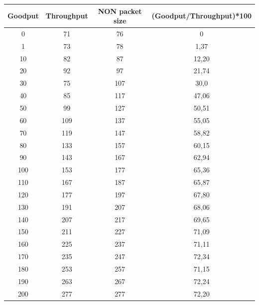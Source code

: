 \begin{center}
 \begin{tabular}{||c c c c||} 
 \hline
 Goodput & Throughput & NON packet size & (Goodput/Throughput)*100 \\ [0.5ex] 
 \hline\hline
 0 & 71 & 76 & 0 \\ 
 \hline
 1 & 73 & 78 & 1,37 \\
 \hline
 10 & 82 & 87 & 12,20 \\
 \hline
 20 & 92 & 97 & 21,74 \\
  \hline
 30 & 75 & 107 & 30,0 \\
  \hline
 40 & 85 & 117 & 47,06 \\
  \hline
 50 & 99 & 127 & 50,51 \\
  \hline
 60 & 109 & 137 & 55,05 \\
  \hline
 70 & 119 & 147 & 58,82 \\
  \hline
 80 & 133 & 157 & 60,15 \\
  \hline
 90 & 143 & 167 & 62,94 \\
 \hline
 100 & 153 & 177 & 65,36 \\
 \hline
 110 & 167 & 187 & 65,87 \\
 \hline
 120 & 177 & 197 & 67,80 \\
 \hline
 130 & 191 & 207 & 68,06 \\
 \hline
 140 & 207 & 217 & 69,65 \\
 \hline
 150 & 211 & 227 & 71,09 \\
 \hline
 160 & 225 & 237 & 71,11 \\
 \hline
 170 & 235 & 247 & 72,34 \\
 \hline
 180 & 253 & 257 & 71,15 \\
 \hline
 190 & 263 & 267 & 72,24 \\
 \hline
 200 & 277 & 277 & 72,20 \\ [1ex] 
 \hline
\end{tabular}
\label{table:1}
\end{center}

